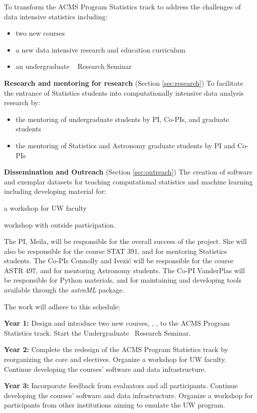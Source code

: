   To transform the ACMS Program Statistics track to address the
  challenges of data intensive statistics including:
\begin{itemize}
  \item two new courses
  \item a  new data intensive research and education curriculum 
  \item an undergraduate \cdse~ Research Seminar
  \end{itemize}
\item {\bf Research and mentoring for research} (Section \ref{sec:research})
To facilitate the entrance of Statistics students into computationally
intensive data analysis research by:
\begin{itemize}
  \item the mentoring of undergraduate students by PI, Co-PIs, and graduate students
  \item the mentoring of Statistics and Astronomy graduate students by PI and Co-PIs
  \end{itemize}
\item {\bf Dissemination and Outreach} (Section \ref{sec:outreach})
 The creation of software and exemplar datasets for teaching
 computational statistics and machine learning including developing
 material for:
 \bits
  \item a workshop for UW faculty %
  \item workshop with outside participation. 
 \eits
\eits  

The PI, Meila, will be responsible for the overall success of the project. She will also be 
responsible for the course STAT 391, and for mentoring Statistics students. The Co-PIs 
Connolly and Ivezi\'{c} will be responsible for the course ASTR 497, and for mentoring 
Astronomy students. The Co-PI VanderPlas will be responsible for Python materials, 
and for maintaining and developing tools available through the {\it astroML} package. 


The work will adhere to this schedule: 
\bits
\item {\bf  Year 1:} Design and introduce two new courses, \statcl, \astrocl, to
the ACMS Program Statistics track. Start the Undergraduate \cdse\ Research Seminar. 
\item {\bf Year 2:} Complete the redesign of the ACMS Program Statistics track
by reorganizing the core and electives. Organize a workshop for UW faculty. 
Continue developing the courses' software and data infrastructure. 
\item {\bf Year 3:} Incorporate feedback from evaluators and all participants. 
Continue developing the courses' software and data infrastructure. 
Organize a workshop for participants from other institutions aiming to 
emulate the UW program.
\eits

